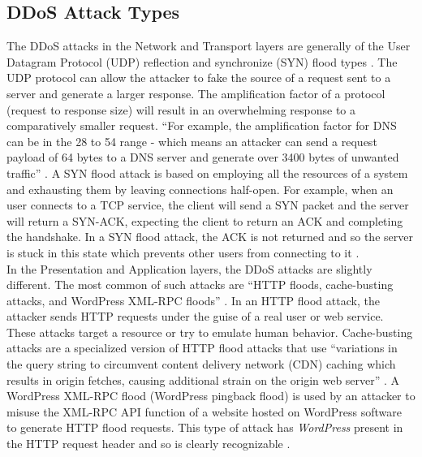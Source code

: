 \subsection{DDoS Attack Types}
The DDoS attacks in the Network and Transport layers are generally of the User Datagram Protocol (UDP) reflection and synchronize (SYN) flood types \cite{amazon02}. The UDP protocol can allow the attacker to fake the source of a request sent to a server and generate a larger response. The amplification factor of a protocol (request to response size) will result in an overwhelming response to a comparatively smaller request. ``For example, the amplification factor for DNS can be in the 28 to 54 range - which means an attacker can send a request payload of 64 bytes to a DNS server and generate over 3400 bytes of unwanted traffic'' \cite{amazon02}. A SYN flood attack is based on employing all the resources of a system and exhausting them by leaving connections half-open. For example, when an user connects to a TCP service, the client will send a SYN packet and the server will return a SYN-ACK, expecting the client to return an ACK and completing the handshake. In a SYN flood attack, the ACK is not returned and so the server is stuck in this state which prevents other users from connecting to it \cite{amazon02}.\\
In the Presentation and Application layers, the DDoS attacks are slightly different. The most common of such attacks are ``HTTP floods, cache-busting attacks, and WordPress XML-RPC floods'' \cite{amazon02}. In an HTTP flood attack, the attacker sends HTTP requests under the guise of a real user or web service. These attacks target a resource or try to emulate human behavior. Cache-busting attacks are a specialized version of HTTP flood attacks that use ``variations in the query string to circumvent content delivery network (CDN) caching which results in origin fetches, causing additional strain on the origin web server'' \cite{amazon02}. A WordPress XML-RPC flood (WordPress pingback flood) is used by an attacker to misuse the XML-RPC API function of a website hosted on WordPress software to generate HTTP flood requests. This type of attack has {\em WordPress} present in the HTTP request header and so is clearly recognizable \cite{amazon02}.
